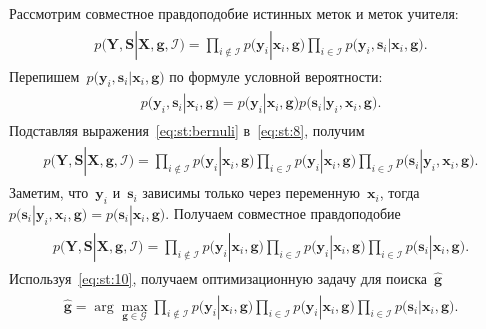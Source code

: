 Рассмотрим совместное правдоподобие истинных меток и меток учителя:
\begin{gather}
\label{eq:st:8}
\begin{aligned}
p\bigr(\mathbf{Y}, \mathbf{S}|\mathbf{X}, \mathbf{g}, \mathcal{I}\bigr)=\prod_{i\not\in \mathcal{I}}p\bigr(\mathbf{y}_i|\mathbf{x}_i, \mathbf{g}\bigr)\prod_{i\in \mathcal{I}}p\bigr(\mathbf{y}_i, \mathbf{s}_i|\mathbf{x}_i, \mathbf{g}\bigr).
\end{aligned}
\end{gather}
Перепишем~$p\bigr(\mathbf{y}_i, \mathbf{s}_i|\mathbf{x}_i, \mathbf{g}\bigr)$ по формуле условной вероятности:
\begin{gather}
\label{eq:st:bernuli}
\begin{aligned}
p\bigr(\mathbf{y}_i, \mathbf{s}_i|\mathbf{x}_i, \mathbf{g}\bigr) = p\bigr(\mathbf{y}_i|\mathbf{x}_i, \mathbf{g}\bigr)p\bigr(\mathbf{s}_i|\mathbf{y}_i, \mathbf{x}_i, \mathbf{g}\bigr).
\end{aligned}
\end{gather}
Подставляя выражения~\eqref{eq:st:bernuli} в~\eqref{eq:st:8}, получим
\begin{gather}
\label{eq:st:9}
\begin{aligned}
p\bigr(\mathbf{Y}, \mathbf{S}|\mathbf{X}, \mathbf{g}, \mathcal{I}\bigr)=\prod_{i\not\in \mathcal{I}}p\bigr(\mathbf{y}_i|\mathbf{x}_i, \mathbf{g}\bigr)\prod_{i\in \mathcal{I}}p\bigr(\mathbf{y}_i|\mathbf{x}_i, \mathbf{g}\bigr)\prod_{i\in \mathcal{I}}p\bigr(\mathbf{s}_i|\mathbf{y}_i, \mathbf{x}_i, \mathbf{g}\bigr).
\end{aligned}
\end{gather}
Заметим, что~$\mathbf{y}_i$ и~$\mathbf{s}_i$ зависимы только через переменную~$\mathbf{x}_i$, тогда~$p\bigr(\mathbf{s}_i|\mathbf{y}_i, \mathbf{x}_i, \mathbf{g}\bigr)=p\bigr(\mathbf{s}_i|\mathbf{x}_i, \mathbf{g}\bigr)$. Получаем совместное правдоподобие
\begin{gather}
\label{eq:st:10}
\begin{aligned}
p\bigr(\mathbf{Y}, \mathbf{S}|\mathbf{X}, \mathbf{g}, \mathcal{I}\bigr)=\prod_{i\not\in \mathcal{I}}p\bigr(\mathbf{y}_i|\mathbf{x}_i, \mathbf{g}\bigr)\prod_{i\in \mathcal{I}}p\bigr(\mathbf{y}_i|\mathbf{x}_i, \mathbf{g}\bigr)\prod_{i\in \mathcal{I}}p\bigr(\mathbf{s}_i|\mathbf{x}_i, \mathbf{g}\bigr).
\end{aligned}
\end{gather}
Используя~\eqref{eq:st:10}, получаем оптимизационную задачу для поиска~$\hat{\mathbf{g}}$
\begin{gather}
\label{eq:st:11}
\begin{aligned}
\hat{\mathbf{g}} = \arg\max_{\mathbf{g}\in \mathcal{G}} \prod_{i\not\in \mathcal{I}}p\bigr(\mathbf{y}_i|\mathbf{x}_i, \mathbf{g}\bigr)\prod_{i\in \mathcal{I}}p\bigr(\mathbf{y}_i|\mathbf{x}_i, \mathbf{g}\bigr)\prod_{i\in \mathcal{I}}p\bigr(\mathbf{s}_i|\mathbf{x}_i, \mathbf{g}\bigr).
\end{aligned}
\end{gather}
